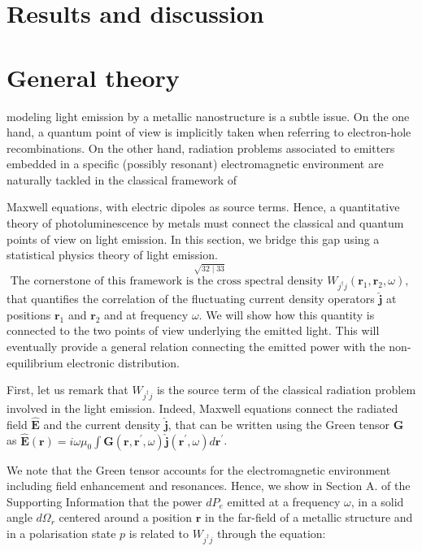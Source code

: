 \documentclass[10pt]{article}
\begin{document}
\section*{Results and discussion}
\section*{General theory}
modeling light emission by a metallic nanostructure is a subtle issue. On the one hand, a quantum point of view is implicitly taken when referring to electron-hole recombinations. On the other hand, radiation problems associated to emitters embedded in a specific (possibly resonant) electromagnetic environment are naturally tackled in the classical framework of

Maxwell equations, with electric dipoles as source terms. Hence, a quantitative theory of photoluminescence by metals must connect the classical and quantum points of view on light emission. In this section, we bridge this gap using a statistical physics theory of light emission. $\stackrel{\sqrt{32 \mid 33}}{\text { The cornerstone of this framework is the cross spectral density } W_{j^{\dagger} j}\left(\boldsymbol{r}_{1}, \boldsymbol{r}_{2}, \omega\right) \text {, }}$ that quantifies the correlation of the fluctuating current density operators $\hat{\boldsymbol{j}}$ at positions $\boldsymbol{r}_{1}$ and $\boldsymbol{r}_{2}$ and at frequency $\omega$. We will show how this quantity is connected to the two points of view underlying the emitted light. This will eventually provide a general relation connecting the emitted power with the non-equilibrium electronic distribution.

First, let us remark that $W_{j^{\dagger} j}$ is the source term of the classical radiation problem involved in the light emission. Indeed, Maxwell equations connect the radiated field $\hat{\boldsymbol{E}}$ and the current density $\hat{\boldsymbol{j}}$, that can be written using the Green tensor $\boldsymbol{G}$ as $\hat{\boldsymbol{E}}(\boldsymbol{r})=i \omega \mu_{0} \int \boldsymbol{G}\left(\boldsymbol{r}, \boldsymbol{r}^{\prime}, \omega\right) \hat{\boldsymbol{j}}\left(\boldsymbol{r}^{\prime}, \omega\right) d \boldsymbol{r}^{\prime}$.

We note that the Green tensor accounts for the electromagnetic environment including field enhancement and resonances. Hence, we show in Section A. of the Supporting Information that the power $d P_{e}$ emitted at a frequency $\omega$, in a solid angle $d \Omega_{r}$ centered around a position $\boldsymbol{r}$ in the far-field of a metallic structure and in a polarisation state $p$ is related to $W_{j^{\dagger} j}$ through the equation:
\end{document}
